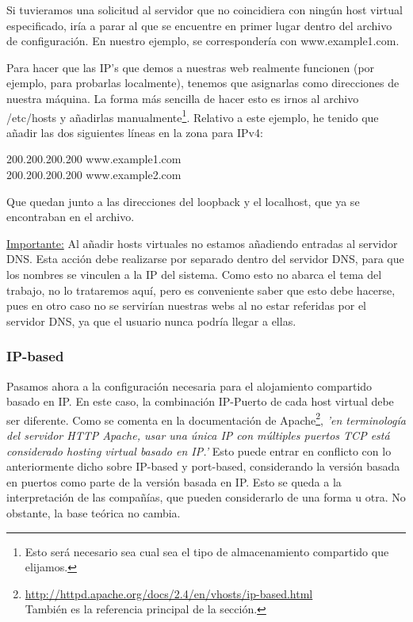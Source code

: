 \documentclass[a4paper, 10pt]{article} %
\begin{document}
Si tuvieramos una solicitud al servidor que no coincidiera con ningún host virtual especificado, iría a parar al que se encuentre en primer lugar dentro del archivo de configuración. En nuestro ejemplo, se correspondería con www.example1.com. 

Para hacer que las IP's que demos a nuestras web realmente funcionen (por ejemplo, para probarlas localmente), tenemos que asignarlas como direcciones de nuestra máquina. La forma más sencilla de hacer esto es irnos al archivo /etc/hosts y añadirlas manualmente\footnote{Esto será necesario sea cual sea el tipo de almacenamiento compartido que elijamos.}. Relativo a este ejemplo, he tenido que añadir las dos siguientes líneas en la zona para IPv4: 

200.200.200.200 www.example1.com\\
200.200.200.200 www.example2.com

Que quedan junto a las direcciones del loopback y el localhost, que ya se encontraban en el archivo. 

\underline{Importante:} Al añadir hosts virtuales no estamos añadiendo entradas al servidor DNS. Esta acción debe realizarse por separado dentro del servidor DNS, para que los nombres se vinculen a la IP del sistema. Como esto no abarca el tema del trabajo, no lo trataremos aquí, pero es conveniente saber que esto debe hacerse, pues en otro caso no se servirían nuestras webs al no estar referidas por el servidor DNS, ya que el usuario nunca podría llegar a ellas. 

\subsubsection{IP-based}

Pasamos ahora a la configuración necesaria para el alojamiento compartido basado en IP. En este caso, la combinación IP-Puerto de cada host virtual debe ser diferente. Como se comenta en la documentación de Apache\footnote{\url{http://httpd.apache.org/docs/2.4/en/vhosts/ip-based.html}\\También es la referencia principal de la sección.}, \textit{'en terminología del servidor HTTP Apache, usar una única IP con múltiples puertos TCP está considerado hosting virtual basado en IP.'} Esto puede entrar en conflicto con lo anteriormente dicho sobre IP-based y port-based, considerando la versión basada en puertos como parte de la versión basada en IP. Esto se queda a la interpretación de las compañías, que pueden considerarlo de una forma u otra. No obstante, la base teórica no cambia. 
\end{document}

